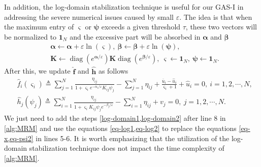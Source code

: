 \documentclass[review,hidelinks,onefignum,onetabnum]{siamart220329}
\begin{document}
In addition, the log-domain stabilization technique \cite{chizat2018scaling}
is useful for our GAS-I in addressing the severe numerical issues caused by small $\varepsilon$. 
The idea is that when the maximum entry of $\bm{\varsigma}$ or $\bm{\psi}$ exceeds a given threshold $\tau$, these two vectors will be normalized to $\bm{1}_N$ and the excessive part will be absorbed in $\bm{\alpha}$ and $\bm{\beta}$
\begin{align}
    &\bm{\alpha} \leftarrow \bm{\alpha} +\varepsilon \ln(\bm{\varsigma}), \ \bm{\beta} \leftarrow   \bm{\beta} +\varepsilon \ln(\bm{\psi}), \label{log-domain1} \\
    &\bm{K} \leftarrow \operatorname{diag}\left(e^{\bm{\alpha} / \varepsilon}\right) \bm{K} \operatorname{diag}\left(e^{\bm{\beta} / \varepsilon}\right), \
     \bm{\varsigma}\leftarrow \bm{1}_N, \ \bm{\psi}\leftarrow  \bm{1}_N.\label{log-domain2}
\end{align}
After this, we update $\bm{\hat{f}}$ and $\bm{\hat{h}}$ as follows 
\begin{align}
    &\hat{f}_i(\varsigma_i) \triangleq \sum_{j=1}^{N}\frac{\eta_{ij}}{1+\varsigma_i e^{-\alpha_i / \varepsilon} K_{ij} \psi_j}-\sum_{j=1}^{N} \eta_{ij}+\frac{\overline{u}_i-\hat{u}_i}{\varsigma_i+1} +\hat{u}_i=0,\ i=1,2,\cdots ,N,\label{eq-log1} \\
    &\hat{h}_j(\psi_j) \triangleq \sum_{i=1}^{N}\frac{\eta_{ij}}{1+\varsigma_i K_{ij} \psi_j e^{-\beta_j / \varepsilon}} - \sum_{i=1}^{N} \eta_{ij}+v_j=0, \ j=1,2,\cdots ,N.\label{eq-log2} 
\end{align}
We just need to add the steps \cref{log-domain1,log-domain2} after line 8 in \cref{alg:MRM} and use the equations \cref{eq-log1,eq-log2} to replace the equations \cref{eq-x,eq-psi2} in lines 5-6. 
It is worth emphasizing that the utilization of the log-domain stabilization technique does not impact the time complexity of \cref{alg:MRM}. 
\end{document}
